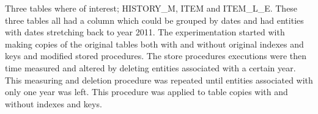 \documentclass{cslthse-msc}
\begin{document}

\noindent Three tables where of interest; HISTORY\_M, ITEM and ITEM\_L\_E. These three tables all had a column which could be grouped by dates and had entities with dates stretching back to year 2011. The experimentation started with making copies of the original tables both with and without original indexes and keys and modified stored procedures. The store procedures executions were then time measured and altered by deleting entities associated with a certain year. This measuring and deletion procedure was repeated until entities associated with only one year was left. This procedure was applied to table copies with and without indexes and keys.  
\end{document}
